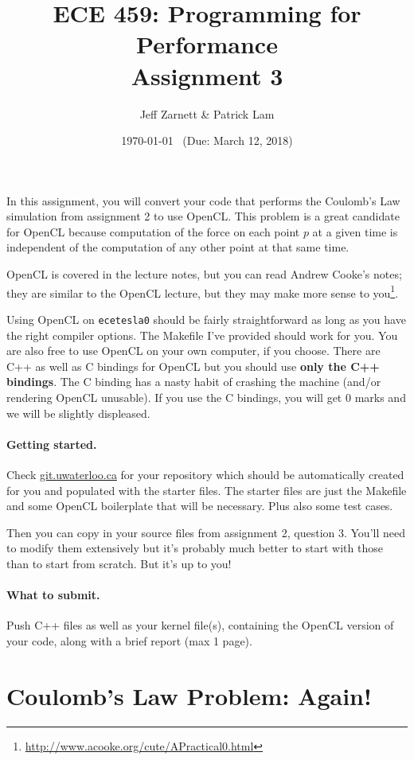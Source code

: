 \documentclass[letterpaper,10pt]{article}
\title{\bf ECE 459: Programming for Performance\\Assignment 3}
\author{Jeff Zarnett \& Patrick Lam}
\date{\today ~ (Due: March 12, 2018)}
\begin{document}
\maketitle

In this assignment, you will convert your code that performs the Coulomb's Law 
simulation from assignment 2 to use OpenCL. This problem is a great candidate for
OpenCL because computation of the force on each point $p$ at a given time is
independent of the computation of any other point at that same time. 


OpenCL is covered in the lecture notes, but you can read Andrew Cooke's notes; they 
are similar to the OpenCL lecture, but they may make more sense to you\footnote{\url{http://www.acooke.org/cute/APractical0.html}}.

Using OpenCL on \texttt{ecetesla0} should be fairly straightforward as long as
you have the right compiler options. The Makefile I've provided
should work for you. You are also free to use OpenCL on your own
computer, if you choose. There are C++ as well as C bindings for OpenCL but you 
should use \textbf{only the C++ bindings}. The C binding has a nasty habit of 
crashing the machine (and/or rendering OpenCL unusable). If you use the C bindings, 
you will get 0 marks and we will be slightly displeased.

\paragraph{Getting started.} 
Check \url{git.uwaterloo.ca} for your repository which should 
be automatically created for you and populated with the starter files. The starter 
files are just the Makefile and some OpenCL boilerplate that will be necessary.
Plus also some test cases.

Then you can copy in your source files from assignment 2, question 3. You'll need to 
modify them extensively but it's probably much better to start with those than to 
start from scratch. But it's up to you!

\paragraph{What to submit.} Push C++ files as well as your kernel file(s), containing 
the OpenCL version of your code, along with a brief report (max 1 page).

\section*{Coulomb's Law Problem: Again!}
\end{document}
